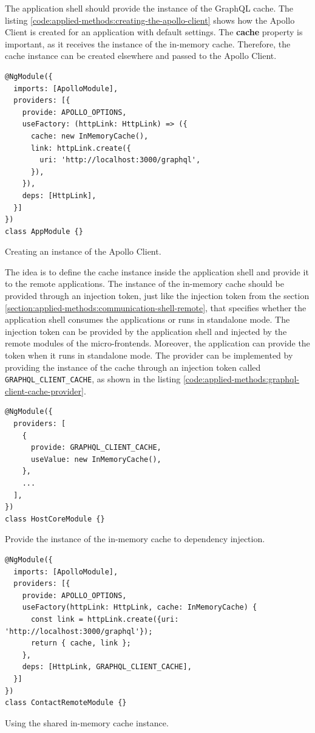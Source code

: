 \noindent The application shell should provide the instance of the GraphQL cache. The listing \ref{code:applied-methods:creating-the-apollo-client} shows how the Apollo Client is created for an application with default settings. The \textbf{cache} property is important, as it receives the instance of the in-memory cache. Therefore, the cache instance can be created elsewhere and passed to the Apollo Client. 
\ifshowListings
\begin{listing}[H]
\begin{verbatim}
@NgModule({
  imports: [ApolloModule],
  providers: [{
    provide: APOLLO_OPTIONS,
    useFactory: (httpLink: HttpLink) => ({
      cache: new InMemoryCache(),
      link: httpLink.create({
        uri: 'http://localhost:3000/graphql',
      }),
    }),
    deps: [HttpLink],
  }]
})
class AppModule {}
\end{verbatim}
\caption{Creating an instance of the Apollo Client.}\label{code:applied-methods:creating-the-apollo-client}
\end{listing}
\fi

\noindent The idea is to define the cache instance inside the application shell and provide it to the remote applications. The instance of the in-memory cache should be provided through an injection token, just like the injection token from the section \ref{section:applied-methods:communication-shell-remote}, that specifies whether the application shell consumes the applications or runs in standalone mode. The injection token can be provided by the application shell and injected by the remote modules of the micro-frontends. Moreover, the application can provide the token when it runs in standalone mode. The provider can be implemented by providing the instance of the cache through an injection token called \texttt{GRAPHQL\_CLIENT\_CACHE}, as shown in the listing \ref{code:applied-methods:graphql-client-cache-provider}.

\ifshowListings
\begin{listing}[H]
\begin{verbatim}
@NgModule({
  providers: [
    {
      provide: GRAPHQL_CLIENT_CACHE,
      useValue: new InMemoryCache(),
    },
    ...
  ],
})
class HostCoreModule {}
\end{verbatim}
\caption{Provide the instance of the in-memory cache to dependency injection.}\label{code:applied-methods:graphql-client-cache-provider}
\end{listing}
\fi


\ifshowListings
\begin{listing}[H]
\begin{verbatim}
@NgModule({
  imports: [ApolloModule],
  providers: [{
    provide: APOLLO_OPTIONS,
    useFactory(httpLink: HttpLink, cache: InMemoryCache) {
      const link = httpLink.create({uri: 'http://localhost:3000/graphql'});
      return { cache, link };
    },
    deps: [HttpLink, GRAPHQL_CLIENT_CACHE],
  }]
})
class ContactRemoteModule {}
\end{verbatim}
\caption{Using the shared in-memory cache instance.}\label{code:applied-methods:creating-the-apollo-client-with-a-shared-cache}
\end{listing}
\fi

